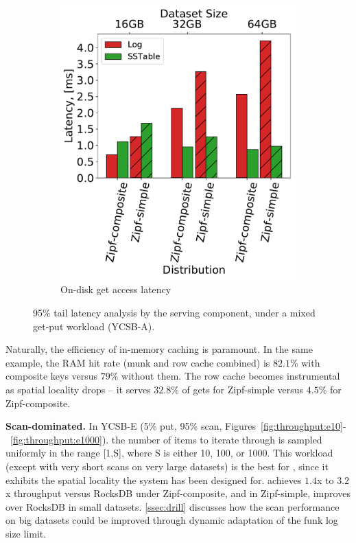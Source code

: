 \begin{figure}[htb]
\begin{subfigure}{0.49\linewidth}
\includegraphics[width=\textwidth]{figs/Latency_A.pdf}
\caption{On-disk get access latency}
\label{fig:readstat:lat}
\end{subfigure}
\caption{{\sys\/ 95\% tail latency analysis by the serving component, under a mixed get-put workload (YCSB-A).}}
\label{fig:readstat}
\end{figure}

Naturally, the efficiency of in-memory caching is paramount. In the same example, the RAM hit rate 
(munk and row cache combined) is 
$82.1\%$ with composite keys versus $79\%$ without them. The row cache becomes instrumental as spatial locality drops --
 it serves $32.8\%$ of gets for Zipf-simple versus $4.5\%$ for Zipf-composite. 

{\bf Scan-dominated.} In YCSB-E (5\% put, 95\% scan, Figures~\ref{fig:throughput:e10}-~\ref{fig:throughput:e1000}).
the number of items to iterate through is  
sampled uniformly in the range [1,S], where S is either 10, 100, or 1000. 
This workload (except with very short scans on very large datasets) is the best for \sys, since it exhibits the spatial locality the system has been designed for. 
\sys\/ achieves $1.4$x to $3.2$x throughput versus RocksDB under Zipf-composite, and in Zipf-simple, improves over RocksDB in small datasets. 
\cref{ssec:drill} discusses how the scan performance on big datasets could be improved through dynamic adaptation of the 
funk log size limit.
 
